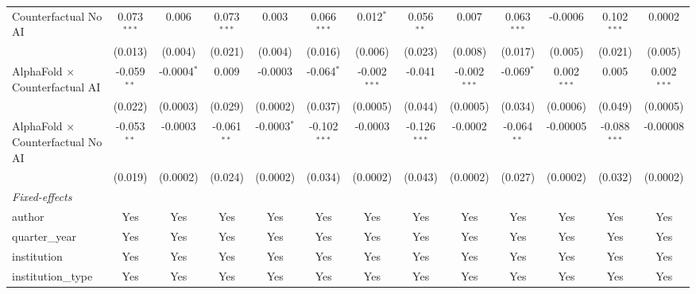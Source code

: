 \begin{tabular}{lcccccccccccc}
   Counterfactual No AI                     & 0.073$^{***}$ & 0.006         & 0.073$^{***}$ & 0.003         & 0.066$^{***}$  & 0.012$^{*}$    & 0.056$^{**}$   & 0.007          & 0.063$^{***}$ & -0.0006       & 0.102$^{***}$  & 0.0002\\   
                                            & (0.013)       & (0.004)       & (0.021)       & (0.004)       & (0.016)        & (0.006)        & (0.023)        & (0.008)        & (0.017)       & (0.005)       & (0.021)        & (0.005)\\   
   AlphaFold $\times$ Counterfactual AI     & -0.059$^{**}$ & -0.0004$^{*}$ & 0.009         & -0.0003       & -0.064$^{*}$   & -0.002$^{***}$ & -0.041         & -0.002$^{***}$ & -0.069$^{*}$  & 0.002$^{***}$ & 0.005          & 0.002$^{***}$\\   
                                            & (0.022)       & (0.0003)      & (0.029)       & (0.0002)      & (0.037)        & (0.0005)       & (0.044)        & (0.0005)       & (0.034)       & (0.0006)      & (0.049)        & (0.0005)\\   
   AlphaFold $\times$ Counterfactual No AI  & -0.053$^{**}$ & -0.0003       & -0.061$^{**}$ & -0.0003$^{*}$ & -0.102$^{***}$ & -0.0003        & -0.126$^{***}$ & -0.0002        & -0.064$^{**}$ & -0.00005      & -0.088$^{***}$ & -0.00008\\   
                                            & (0.019)       & (0.0002)      & (0.024)       & (0.0002)      & (0.034)        & (0.0002)       & (0.043)        & (0.0002)       & (0.027)       & (0.0002)      & (0.032)        & (0.0002)\\   
   \midrule
   \emph{Fixed-effects}\\
   author                                   & Yes           & Yes           & Yes           & Yes           & Yes            & Yes            & Yes            & Yes            & Yes           & Yes           & Yes            & Yes\\  
   quarter\_year                            & Yes           & Yes           & Yes           & Yes           & Yes            & Yes            & Yes            & Yes            & Yes           & Yes           & Yes            & Yes\\  
   institution                              & Yes           & Yes           & Yes           & Yes           & Yes            & Yes            & Yes            & Yes            & Yes           & Yes           & Yes            & Yes\\  
   institution\_type                        & Yes           & Yes           & Yes           & Yes           & Yes            & Yes            & Yes            & Yes            & Yes           & Yes           & Yes            & Yes\\  

\end{tabular}
